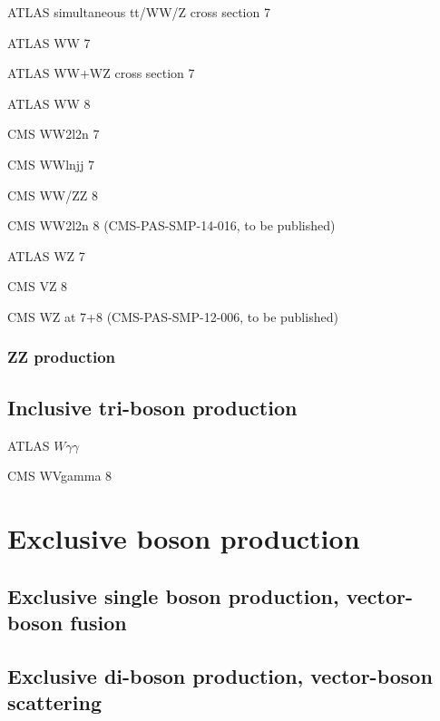 \documentclass[12pt]{iopart}
\begin{document}
ATLAS simultaneous tt/WW/Z cross section 7 \TeV~\cite{Aad:2014jra}

ATLAS WW 7 \TeV~\cite{ATLAS:2012mec}

ATLAS WW+WZ cross section 7 \TeV~\cite{Aad:2014mda}

ATLAS WW 8 \TeV~\cite{ATLAS-CONF-2014-033}

CMS WW2l2n 7 \TeV~\cite{Chatrchyan:2013yaa}

CMS WWlnjj 7 \TeV~\cite{Chatrchyan:2012bd}

CMS WW/ZZ 8 \TeV~\cite{Chatrchyan:2013oev}

CMS WW2l2n 8 \TeV (CMS-PAS-SMP-14-016, to be published)


ATLAS WZ 7 \TeV~\cite{Aad:2012twa}

CMS VZ 8 \TeV~\cite{Chatrchyan:2014aqa}

CMS WZ at 7+8 \TeV (CMS-PAS-SMP-12-006, to be published)

\subsubsection{ZZ production}
\label{sss-ZZprod}








\subsection{Inclusive tri-boson production}

ATLAS $W\gamma\gamma$~\cite{Aad:2015uqa}

CMS WVgamma 8 \TeV~\cite{Chatrchyan:2014bza}

\section{Exclusive boson production}
\subsection{Exclusive single boson production, vector-boson fusion}


\subsection{Exclusive di-boson production, vector-boson scattering}

\end{document}
